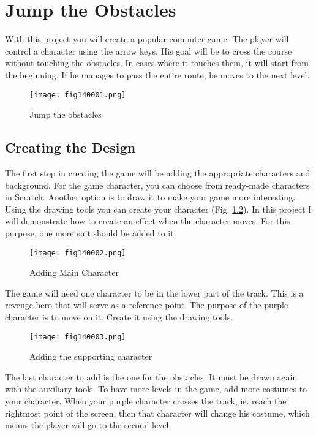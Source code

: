 \chapter{Jump the Obstacles}

With this project you will create a popular computer game. The player will control a character using the arrow keys. His goal will be to cross the course without touching the obstacles. In cases where it touches them, it will start from the beginning. If he manages to pass the entire route, he moves to the next level.

\begin{figure}[H]
   \centering
   \texttt{[image: fig140001.png]}
   \caption{Jump the obstacles}
\label{fig140001}
\end{figure}

\section{Creating the Design}
The first step in creating the game will be adding the appropriate characters and background. For the game character, you can choose from ready-made characters in Scratch. Another option is to draw it to make your game more interesting. Using the drawing tools you can create your character (Fig. \ref{fig140002}). In this project I will demonstrate how to create an effect when the character moves. For this purpose, one more suit should be added to it.

\begin{figure}[H]
   \centering
   \texttt{[image: fig140002.png]}
   \caption{Adding Main Character}
\label{fig140002}
\end{figure}

The game will need one character to be in the lower part of the track. This is a revenge hero that will serve as a reference point. The purpose of the purple character is to move on it. Create it using the drawing tools.

\begin{figure}[H]
   \centering
   \texttt{[image: fig140003.png]}
   \caption{Adding the supporting character}
\label{fig140003}
\end{figure}

The last character to add is the one for the obstacles. It must be drawn again with the auxiliary tools. To have more levels in the game, add more costumes to your character. When your purple character crosses the track, ie. reach the rightmost point of the screen, then that character will change his costume, which means the player will go to the second level.

